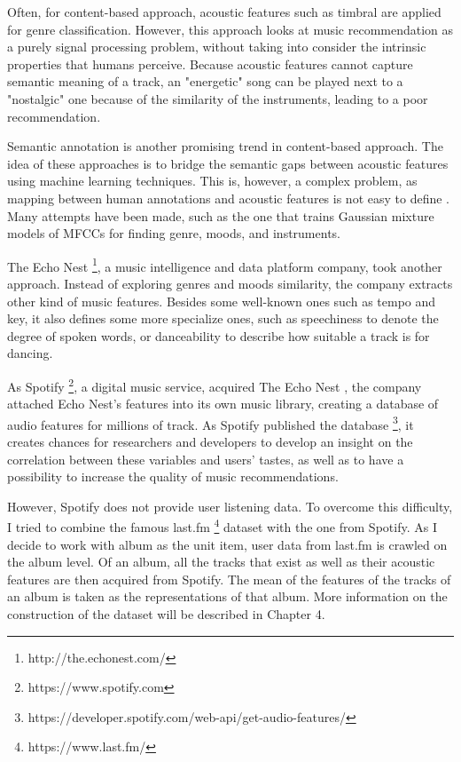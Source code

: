 Often, for content-based approach, acoustic features such as timbral are applied for genre classification. However, this approach looks at music recommendation as a purely signal processing problem, without taking into consider the intrinsic properties that humans perceive. Because acoustic features cannot capture semantic meaning of a track, an "energetic" song can be played next to a "nostalgic" one because of the similarity of the instruments, leading to a poor recommendation.

Semantic annotation is another promising trend in content-based approach. The idea of these approaches is to bridge the semantic gaps between acoustic features using machine learning techniques. This is, however, a complex problem, as mapping between human annotations and acoustic features is not easy to define \cite{aucouturier2009sounds}. Many attempts have been made, such as the one that trains Gaussian mixture models of MFCCs for finding genre, moods, and instruments. 

The Echo Nest \footnote{http://the.echonest.com/}, a music intelligence and data platform company, took another approach. Instead of exploring genres and moods similarity, the company extracts other kind of music features. Besides some well-known ones such as tempo and key, it also defines some more specialize ones, such as speechiness to denote the degree of spoken words, or danceability to describe how suitable a track is for dancing. 

As Spotify \footnote{https://www.spotify.com}, a digital music service, acquired The Echo Nest \cite{press_2014}, the company attached Echo Nest's features into its own music library, creating a database of audio features for millions of track. As Spotify published the database \footnote{https://developer.spotify.com/web-api/get-audio-features/}, it creates chances for researchers and developers to develop an insight on the correlation between these variables and users' tastes, as well as to have a possibility to increase the quality of music recommendations.

However, Spotify does not provide user listening data. To overcome this difficulty, I tried to combine the famous last.fm \footnote{https://www.last.fm/} dataset with the one from Spotify. As I decide to work with album as the unit item, user data from last.fm is crawled on the album level. Of an album, all the tracks that exist as well as their acoustic features are then acquired from Spotify. The mean of the features of the tracks of an album is taken as the representations of that album. More information on the construction of the dataset will be described in Chapter 4. 

